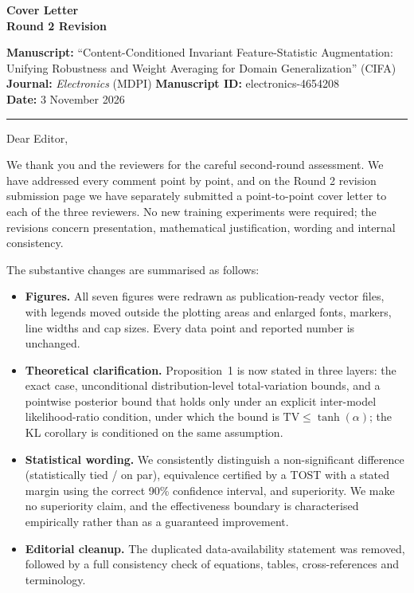 \documentclass[11pt]{article}
\begin{document}
\begin{center}
{\Large\textbf{Cover Letter}}\\[0.5em]
\textbf{Round 2 Revision}
\end{center}

\textbf{Manuscript:} ``Content-Conditioned Invariant Feature-Statistic
Augmentation: Unifying Robustness and Weight Averaging for Domain
Generalization'' (CIFA)\\
\textbf{Journal:} \textit{Electronics} (MDPI)\qquad
\textbf{Manuscript ID:} electronics-4654208\\
\textbf{Date:} 3 November 2026

\hrule
\vspace{0.3em}

Dear Editor,

We thank you and the reviewers for the careful second-round assessment. We
have addressed every comment point by point, and on the Round 2 revision
submission page we have separately submitted a point-to-point cover letter
to each of the three reviewers. No new training experiments were required;
the revisions concern presentation, mathematical justification, wording and
internal consistency.

The substantive changes are summarised as follows:
\begin{itemize}
\item \textbf{Figures.} All seven figures were redrawn as publication-ready
vector files, with legends moved outside the plotting areas and enlarged
fonts, markers, line widths and cap sizes. Every data point and reported
number is unchanged.
\item \textbf{Theoretical clarification.} Proposition~1 is now stated in
three layers: the exact case, unconditional distribution-level
total-variation bounds, and a pointwise posterior bound that holds only
under an explicit inter-model likelihood-ratio condition, under which the
bound is $\mathrm{TV}\le\tanh(\alpha)$; the KL corollary is conditioned on
the same assumption.
\item \textbf{Statistical wording.} We consistently distinguish a
non-significant difference (statistically tied / on par), equivalence
certified by a TOST with a stated margin using the correct 90\% confidence
interval, and superiority. We make no superiority claim, and the
effectiveness boundary is characterised empirically rather than as a
guaranteed improvement.
\item \textbf{Editorial cleanup.} The duplicated data-availability
statement was removed, followed by a full consistency check of equations,
tables, cross-references and terminology.
\end{itemize}
\end{document}
